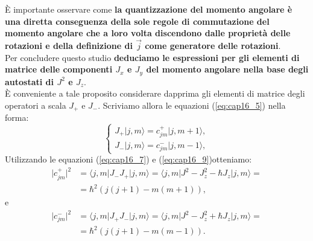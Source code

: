 \documentclass[a4paper,12pt,oneside]{book}
\begin{document}
È importante osservare come \textbf{la quantizzazione del momento angolare è una diretta conseguenza della sole regole di commutazione del momento  angolare che a loro volta discendono dalle proprietà delle rotazioni e della definizione di $\vec{j}$ come generatore delle rotazioni}.\\

Per concludere questo studio \textbf{deduciamo le espressioni per gli elementi di matrice delle componenti $J_x$ e $J_y$ del momento angolare nella base degli autostati di $J^2$ e $J_z$}.\\

È conveniente a tale proposito considerare dapprima gli elementi di matrice degli operatori a scala $J_+$ e $J_-$. Scriviamo allora le equazioni (\ref{eq:cap16_5}) nella forma:
	\begin{equation}
		\begin{cases}
			J_+\vert j, m \rangle = c_{jm} ^+\vert j, m+1 \rangle , \\
			J_-\vert j, m \rangle = c_{jm} ^-\vert j, m-1 \rangle ,
		\end{cases}
	\end{equation}
Utilizzando le equazioni (\ref{eq:cap16_7}) e (\ref{eq:cap16_9})otteniamo:
	\begin{align}
		\vert c_{jm} ^+\vert ^2 &= \langle j, m \vert J_- J_+\vert j, m \rangle = \langle j, m \vert J^2- J_z ^2 -\hbar J_z\vert j, m \rangle =\nonumber \\
		&= \hbar ^2 \left( j(j+1) - m (m+1)\right) ,
	\end{align}
e
	\begin{align}
		\vert c_{jm} ^-\vert ^2 &= \langle j, m \vert J_+ J_-\vert j, m \rangle = \langle j, m \vert J^2- J_z ^2 +\hbar J_z\vert j, m \rangle =\nonumber \\
		&= \hbar ^2 \left( j(j+1) - m (m-1)\right) .
	\end{align}\\
	
\end{document}
